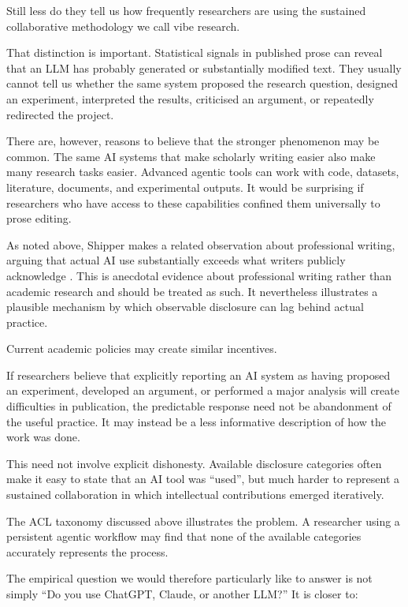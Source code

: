 \documentclass[12pt]{article}
\begin{document}
Still less do they tell us how frequently researchers are using the sustained collaborative methodology we call vibe research.

That distinction is important. Statistical signals in published prose can reveal that an LLM has probably generated or substantially modified text. They usually cannot tell us whether the same system proposed the research question, designed an experiment, interpreted the results, criticised an argument, or repeatedly redirected the project.

There are, however, reasons to believe that the stronger phenomenon may be common. The same AI systems that make scholarly writing easier also make many research tasks easier. Advanced agentic tools can work with code, datasets, literature, documents, and experimental outputs. It would be surprising if researchers who have access to these capabilities confined them universally to prose editing.

As noted above, Shipper makes a related observation about professional writing, arguing that actual AI use substantially exceeds what writers publicly acknowledge \citep{newton2026editorclone}. This is anecdotal evidence about professional writing rather than academic research and should be treated as such. It nevertheless illustrates a plausible mechanism by which observable disclosure can lag behind actual practice.

Current academic policies may create similar incentives.

If researchers believe that explicitly reporting an AI system as having proposed an experiment, developed an argument, or performed a major analysis will create difficulties in publication, the predictable response need not be abandonment of the useful practice. It may instead be a less informative description of how the work was done.

This need not involve explicit dishonesty. Available disclosure categories often make it easy to state that an AI tool was ``used'', but much harder to represent a sustained collaboration in which intellectual contributions emerged iteratively.

The ACL taxonomy discussed above illustrates the problem. A researcher using a persistent agentic workflow may find that none of the available categories accurately represents the process.

The empirical question we would therefore particularly like to answer is not simply ``Do you use ChatGPT, Claude, or another LLM?'' It is closer to:
\end{document}
